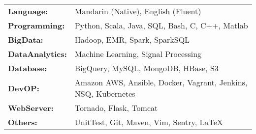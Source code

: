 \begin{tabular}{ l p{6cm}}
  \textbf{Language:} & Mandarin (Native), English (Fluent)\\
  \textbf{Programming:} & Python, Scala, Java, SQL, Bash, C, C++, Matlab\\
  \textbf{BigData:} & Hadoop, EMR, Spark, SparkSQL\\
  \textbf{DataAnalytics:} & Machine Learning, Signal Processing\\
  \textbf{Database:} & BigQuery, MySQL, MongoDB, HBase, S3\\
  \textbf{DevOP:} & Amazon AWS, Ansible, Docker, Vagrant, Jenkins, NSQ, Kubernetes\\
  \textbf{WebServer:} & Tornado, Flask, Tomcat\\
  \textbf{Others:} & UnitTest, Git, Maven, Vim, Sentry, \LaTeX
\end{tabular}
